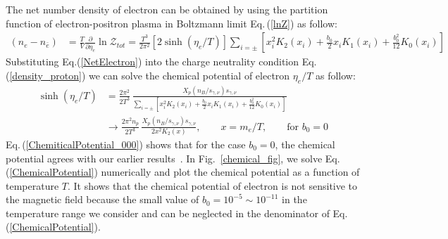 \documentclass[universe,article,submit,moreauthors,pdftex,a4paper]{Definitions/mdpi}
\newcommand{\req}[1]{Eq.\,(\ref{#1})}
\newcommand*{\rf}[1]{Fig.~{\ref{#1}}}
\begin{document}
The net number density of electron can be obtained by using the partition function of electron-positron plasma in Boltzmann limit \req{lnZ} as follow:
\begin{align}\label{NetElectron}
\left(n_e-n_{\bar e}\right)&=\frac{T}{V}\frac{\partial}{\partial \eta_{e}}\ln\mathcal{Z}_{tot}=\frac{T^3}{2\pi^2}\left[2\sinh{(\eta_{e}/T)}\right]\sum_{i=\pm}\left[x_i^2K_2(x_i)+\frac{b_0}{2}x_i K_1(x_i)+\frac{b^2_0}{12}K_0(x_i)\right]
\end{align}
Substituting Eq.(\ref{NetElectron}) into the charge neutrality condition Eq.(\ref{density_proton}) we can solve the chemical potential of electron $\eta_e/T$ as follow:
\begin{align}\label{ChemicalPotential}
\sinh{(\eta_{e}/T)}&=\frac{2\pi^2}{2T^3}\,\frac{X_p(n_B/s_{\gamma,\nu})s_{\gamma,\nu}}{\sum_{i=\pm}\left[x_i^2K_2(x_i)+\frac{b_0}{2}x_i K_1(x_i)+\frac{b^2_0}{12}K_0(x_i)\right]}\\
&\longrightarrow\frac{2\pi^2n_p}{2T^3}\,\frac{X_p(n_B/s_{\gamma,\nu})s_{\gamma,\nu}}{2x^2K_2(x)},\qquad x=m_e/T,\qquad \mathrm{for}\,\,b_0=0\label{ChemiticalPotential_000}
\end{align}
\req{ChemiticalPotential_000} shows that for the case $b_0=0$, the chemical potential agrees with our earlier results~\cite{Chris:2023abc}.
In {\rf{chemical_fig}}, we solve \req{ChemicalPotential} numerically and plot the chemical potential as a function of temperature $T$. It shows that the chemical potential of electron is not sensitive to the magnetic field because the small value of $b_0=10^{-5}\sim10^{-11}$ in the temperature range we consider and can be neglected in the denominator of \req{ChemicalPotential}. 
\end{document}
